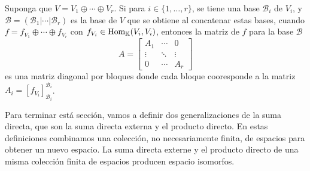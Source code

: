 \begin{obs}\label{diagonalbloques}
  Suponga que $V=V_1\oplus\cdots\oplus V_r$. Si para $i\in\{1,\ldots,r\}$, se tiene una base $\mathcal{B}_i$ de $V_i$, y $\mathcal{B}=\left(\mathcal{B}_1|\cdots|\mathcal{B}_r\right)$ es la base de $V$ que se obtiene al concatenar estas bases, cuando $f=f_{V_1}\oplus\cdots\oplus f_{V_r}$ con $f_{V_i}\in\operatorname{Hom}_\mathbb{K}(V_i,V_i)$, entonces la matriz de $f$ para la base $\mathcal{B}$
  $$A=\left[\begin{array}{c|c|c}
    A_1 & \cdots & 0\\
    \hline
    \vdots & \ddots & \vdots\\
    \hline
    0 & \cdots & A_r
  \end{array}\right]$$
es una matriz diagonal por bloques donde cada bloque cooresponde a la matriz $A_i=\left[f_{V_i}\right]_{\mathcal{B}_i}^{\mathcal{B}_i}$.
\end{obs}

\begin{obs}
Para terminar est\'a secci\'on, vamos a definir dos generalizaciones de la suma directa, que son la suma directa externa y el producto directo. En estas definiciones combinamos una colecci\'on, no necesariamente finita, de espacios para obtener un nuevo espacio. La suma directa externe y el producto directo de una misma colecci\'on finita de espacios producen espacio isomorfos.
\end{obs}

